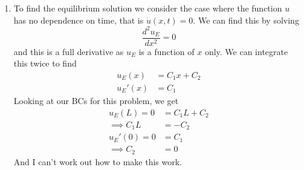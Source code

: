 \documentclass[12pt]{article}
\numberwithin{equation}{section}
\numberwithin{figure}{section}
\begin{document}
\begin{enumerate}
\begin{enumerate}
            \item To find the equilibrium solution we consider the case where the function $u$ has no dependence 
            on time, that is $\dot{u}(x,t)=0$. We can find this by solving
            \begin{equation*}
                \frac{d^2u_E}{dx^2}=0
            \end{equation*}
            and this is a full derivative as $u_E$ is a function of $x$ only. We can integrate this twice to find 
            \begin{align*}
                u_E(x)&=C_1x+C_2\\
                u_E'(x)&=C_1
            \end{align*}
            Looking at our BCs for this problem, we get
            \begin{align*}
                u_E(L)=0&=C_1L+C_2\\
                \implies C_1L&=-C_2\\
                u_E'(0)=0&=C_1\\
                \implies C_2&=0
            \end{align*}
            And I can't work out how to make this work.

        \end{enumerate}
    \end{enumerate}    
\end{document}
